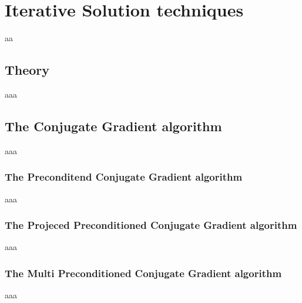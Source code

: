 \chapter{Iterative Solution techniques}
aa
\section{Theory}
aaa
\section{The Conjugate Gradient algorithm}
aaa
\subsection{The Preconditend Conjugate Gradient algorithm}
aaa
\subsection{The Projeced Preconditioned Conjugate Gradient algorithm}
aaa
\subsection{The Multi Preconditioned Conjugate Gradient algorithm}
aaa

